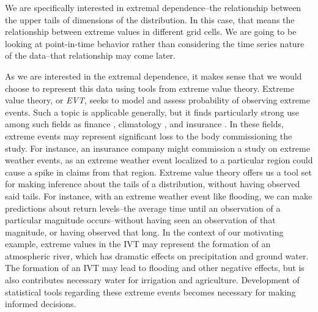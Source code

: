 We are specifically interested in extremal dependence--the relationship between the upper tails of
  dimensions of the distribution.  In this case, that means the relationship between extreme values
  in different grid cells.  We are going to be looking at point-in-time behavior rather than
  considering the time series nature of the data--that relationship may come later.

As we are interested in the extremal dependence, it makes sense that we would choose to represent
  this data using tools from extreme value theory.  Extreme value theory, or \emph{EVT}, seeks to
  model and assess probability of observing extreme events.  Such a topic is applicable generally,
  but it finds particularly strong use among such fields as finance \citep{allen2013},
  climatology \citep{trepanier2018}, and insurance \citep{beirlant1994}.  In these fields, extreme
  events may represent significant loss to the body commissioning the study.  For instance, an
  insurance company might commission a study on extreme weather events, as an extreme weather event
  localized to a particular region could cause a spike in claims from that region.  Extreme value
  theory offers us a tool set for making inference about the tails of a distribution, without having
  observed said tails.  For
  instance, with an extreme weather event like flooding, we can make predictions about return
  levels--the average time until an observation of a particular magnitude occurs--without having seen
  an observation of that magnitude, or having observed that long.  In the context of our motivating
  example, extreme values in the IVT may represent the formation of an atmospheric river, which has
  dramatic effects on precipitation and ground water.  The formation of an IVT may lead to flooding
  and other negative effects, but is also contributes necessary water for irrigation and agriculture.
  Development of statistical tools regarding these extreme events becomes necessary for making informed
  decisions.

